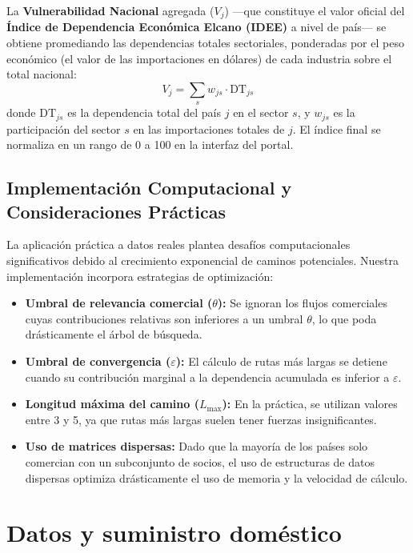 \documentclass[final,1p,times,authoryear]{elsarticle}
\begin{document}
La \textbf{Vulnerabilidad Nacional} agregada ($V_j$) ---que constituye el valor oficial del \textbf{Índice de Dependencia Económica Elcano (IDEE)} a nivel de país--- se obtiene promediando las dependencias totales sectoriales, ponderadas por el peso económico (el valor de las importaciones en dólares) de cada industria sobre el total nacional:
\begin{equation}
V_j = \sum_{s} w_{js} \cdot \text{DT}_{js}
\end{equation}
donde $\text{DT}_{js}$ es la dependencia total del país $j$ en el sector $s$, y $w_{js}$ es la participación del sector $s$ en las importaciones totales de $j$. El índice final se normaliza en un rango de 0 a 100 en la interfaz del portal.

\subsection{Implementación Computacional y Consideraciones Prácticas}

La aplicación práctica a datos reales plantea desafíos computacionales significativos debido al crecimiento exponencial de caminos potenciales. Nuestra implementación incorpora estrategias de optimización:
\begin{itemize}
    \item \textbf{Umbral de relevancia comercial ($\theta$):} Se ignoran los flujos comerciales cuyas contribuciones relativas son inferiores a un umbral $\theta$, lo que poda drásticamente el árbol de búsqueda.
    \item \textbf{Umbral de convergencia ($\varepsilon$):} El cálculo de rutas más largas se detiene cuando su contribución marginal a la dependencia acumulada es inferior a $\varepsilon$.
    \item \textbf{Longitud máxima del camino ($L_{\max}$):} En la práctica, se utilizan valores entre 3 y 5, ya que rutas más largas suelen tener fuerzas insignificantes.
    \item \textbf{Uso de matrices dispersas:} Dado que la mayoría de los países solo comercian con un subconjunto de socios, el uso de estructuras de datos dispersas optimiza drásticamente el uso de memoria y la velocidad de cálculo.
\end{itemize}

\section{Datos y suministro doméstico}\label{sec:datos}
\end{document}
